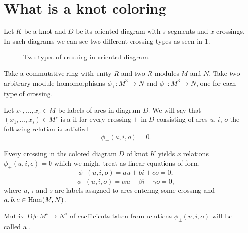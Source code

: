 \section{What is a knot coloring}

Let $K$ be a knot and $D$ be its oriented diagram with $s$ segments and $x$ crossings. In such diagrams we can see two different crossing types as seen in \cref{crossing_type}.
\begin{figure}[h]\centering
  \caption{Two types of crossing in oriented diagram.\label{crossing_type}}
\end{figure}

Take a commutative ring with unity $R$ and two $R$-modules $M$ and $N$. Take two arbitrary module homomorphisms $\phi_+:M^3\to N$ and $\phi_-:M^3\to N$, one for each type of crossing.

\begin{definition}
  Let $x_1,..., x_s\in M$ be labels of arcs in diagram $D$. We will say that $(x_1,...,x_s)\in M^s$ is a  if for every crossing $\pm$ in $D$ consisting of arcs $u$, $i$, $o$ the following relation is satisfied
  $$\phi_\pm(u,i,o)=0.$$
\end{definition}

Every crossing in the colored diagram $D$ of knot $K$ yields $x$ relations $\phi_\pm(u,i,o)=0$ which we might treat as linear equations of form 
$$\phi_+(u,i,o)=au+bi+co=0,$$
$$\phi_-(u,i,o)=\alpha u+ \beta i+ \gamma o=0,$$
where $u$, $i$ and $o$ are labels assigned to arcs entering some crossing and $a,b,c\in\operatorname{Hom}(M, N)$.

\begin{definition}
  Matrix $D\phi:M^s\to N^x$ of coefficients taken from relations $\phi_\pm(u,i,o)$ will be called a . 
\end{definition}

